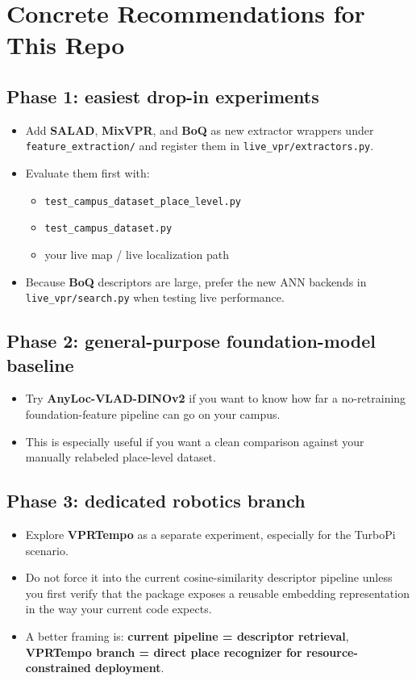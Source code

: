 \documentclass[11pt]{article}
\begin{document}
\section*{Concrete Recommendations for This Repo}
\subsection*{Phase 1: easiest drop-in experiments}
\begin{itemize}[leftmargin=*]
  \item Add \textbf{SALAD}, \textbf{MixVPR}, and \textbf{BoQ} as new extractor wrappers under \texttt{feature\_extraction/} and register them in \texttt{live\_vpr/extractors.py}.
  \item Evaluate them first with:
  \begin{itemize}[leftmargin=*]
    \item \texttt{test\_campus\_dataset\_place\_level.py}
    \item \texttt{test\_campus\_dataset.py}
    \item your live map / live localization path
  \end{itemize}
  \item Because \textbf{BoQ} descriptors are large, prefer the new ANN backends in \texttt{live\_vpr/search.py} when testing live performance.
\end{itemize}

\subsection*{Phase 2: general-purpose foundation-model baseline}
\begin{itemize}[leftmargin=*]
  \item Try \textbf{AnyLoc-VLAD-DINOv2} if you want to know how far a no-retraining foundation-feature pipeline can go on your campus.
  \item This is especially useful if you want a clean comparison against your manually relabeled place-level dataset.
\end{itemize}

\subsection*{Phase 3: dedicated robotics branch}
\begin{itemize}[leftmargin=*]
  \item Explore \textbf{VPRTempo} as a separate experiment, especially for the TurboPi scenario.
  \item Do not force it into the current cosine-similarity descriptor pipeline unless you first verify that the package exposes a reusable embedding representation in the way your current code expects.
  \item A better framing is: \textbf{current pipeline = descriptor retrieval}, \textbf{VPRTempo branch = direct place recognizer for resource-constrained deployment}.
\end{itemize}
\end{document}
